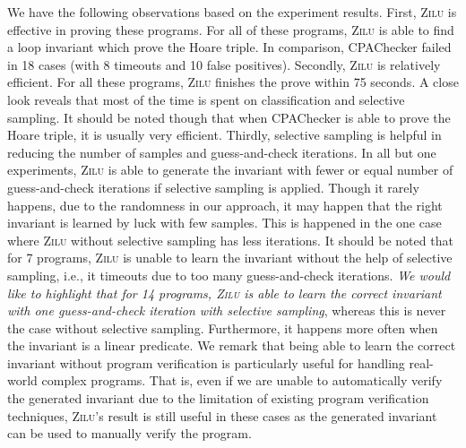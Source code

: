 We have the following observations based on the experiment results. First, \textsc{Zilu} is effective in proving these programs. For all of these programs, \textsc{Zilu} is able to find a loop invariant which prove the Hoare triple. In comparison, CPAChecker failed in 18 cases (with 8 timeouts and 10 false positives). Secondly, \textsc{Zilu} is relatively efficient. For all these programs, \textsc{Zilu} finishes the prove within 75 seconds. A close look reveals that most of the time is spent on classification and selective sampling. It should be noted though that when CPAChecker is able to prove the Hoare triple, it is usually very efficient. 
Thirdly, selective sampling is helpful in reducing the number of samples and guess-and-check iterations. In all but one experiments, \textsc{Zilu} is able to generate the invariant with fewer or equal number of guess-and-check iterations if selective sampling is applied. Though it rarely happens, due to the randomness in our approach, it may happen that the right invariant is learned by luck with few samples. This is happened in the one case where \textsc{Zilu} without selective sampling has less iterations. It should be noted that for 7 programs, \textsc{Zilu} is unable to learn the invariant without the help of selective sampling, i.e., it timeouts due to too many guess-and-check iterations.
\emph{We would like to highlight that for 14 programs, \textsc{Zilu} is able to learn the correct invariant with one guess-and-check iteration with selective sampling}, whereas this is never the case without selective sampling. Furthermore, it happens more often when the invariant is a linear predicate. We remark that being able to learn the correct invariant without program verification is particularly useful for handling real-world complex programs. That is, even if we are unable to automatically verify the generated invariant due to the limitation of existing program verification techniques, \textsc{Zilu}'s result is still useful in these cases as the generated invariant can be used to manually verify the program.




